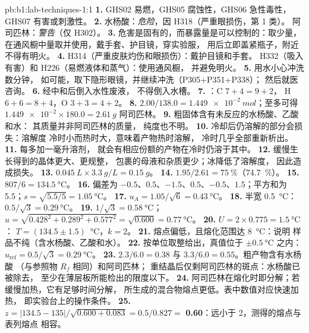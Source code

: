 \begin{solution}{pb:b1:lab-techniques-1:1}
\textbf{1.} GHS02 易燃，GHS05 腐蚀性，GHS06 急性毒性，GHS07
有害或刺激性。
\textbf{2.} 水杨酸：\emph{危险}，因 H318（严重眼损伤，第 1 类）。
阿司匹林：\emph{警告}（仅 H302）。
\textbf{3.} 危害是固有的，而暴露量是可以控制的：取少量，
在通风橱中量取并使用，戴手套、护目镜，穿实验服，
用后立即盖紧瓶子，附近不得有明火。
\textbf{4.} H314（严重皮肤灼伤和眼损伤）：戴护目镜和手套。
H332（吸入有害）和 H226（易燃液体和蒸气）：使用通风橱，
并避免明火。
\textbf{5.} 用水小心冲洗数分钟，
如可能，取下隐形眼镜，并继续冲洗（P305+P351+P338）；
然后就医咨询。
\textbf{6.} 经中和后倒入水性废液，
不得倒入水槽。
\textbf{7.} ：C $7 + 4 = 9 + 2$，
H $6 + 6 = 8 + 4$，O $3 + 3 = 4 + 2$。
\textbf{8.} $2.00/138.0 = \qty{1.449e-2}{mol}$；至多可得
$\num{1.449e-2} \times 180.0 = \qty{2.61}{g}$ 阿司匹林。
\textbf{9.} 粗固体含有未反应的水杨酸、乙酸和水：
其质量并非阿司匹林的质量，
纯度也不明。
\textbf{10.} 冷却后仍溶解的部分会损失：溶解度
冷时小而热时大，意味着产物热时溶解，
冷时几乎全部重新析出。
\textbf{11.} 每多加一毫升溶剂，
就会有相应份额的产物在冷时仍溶于其中。
\textbf{12.} 缓慢生长得到的晶体更大、更规整，
包裹的母液和杂质更少；冰降低了溶解度，
因此造成损失。
\textbf{13.} $\qty{0.045}{L} \times \qty{3.3}{g/L} = \qty{0.15}{g}$。
\textbf{14.} $1.95/2.61 = \qty{75}{\percent}$（\qty{74.7}{\percent}）。
\textbf{15.} $807/6 = \qty{134.5}{\celsius}$。
\textbf{16.} 偏差为 $-0.5$、$0.5$、$-1.5$、$0.5$、$-0.5$、$1.5$；平方和为
5.5；$s = \sqrt{5.5/5} = \qty{1.05}{\celsius}$。
\textbf{17.} $u_A = 1.05/\sqrt6 = \qty{0.43}{\celsius}$。
\textbf{18.} 半宽 \qty{0.5}{\celsius}：$0.5/\sqrt3 = \qty{0.29}{\celsius}$。
\textbf{19.} $1/\sqrt3 = \qty{0.58}{\celsius}$；
$u = \sqrt{0.428^2 + 0.289^2 + 0.577^2} = \sqrt{0.600} = \qty{0.77}{\celsius}$。
\textbf{20.} $U = 2 \times 0.775 = \qty{1.5}{\celsius}$：
$T = (134.5 \pm 1.5)$~\unit{\celsius}，$k = 2$。
\textbf{21.} 熔点偏低，且熔化范围达 \qty{8}{\celsius}：说明
样品不纯（含水杨酸、乙酸和水）。
\textbf{22.} 按单位取整给出，真值位于 $\pm\qty{0.5}{\celsius}$ 之内：
$u_{\mathrm{ref}} = 0.5/\sqrt3 = \qty{0.29}{\celsius}$。
\textbf{23.} $2.3/6.0 = 0.38$ 与 $3.3/6.0 = 0.55$。粗产物含有水杨酸
（与参照物 $R_f$ 相同）和阿司匹林；
重结晶后仅剩阿司匹林的斑点：水杨酸已被除去，
至少在薄层板所能检出的限度以下。
\textbf{24.} 阿司匹林在熔化时即分解；若缓慢加热，它有足够时间分解，
所生成的混合物熔点更低。表中数值对应快速加热，
即实验台上的操作条件。
\textbf{25.} $z = |134.5 - 135|/\sqrt{0.600 + 0.083} = 0.5/0.827 =$
\textbf{0.60}：远小于 2，测得的熔点与表列熔点
相容。
\end{solution}
